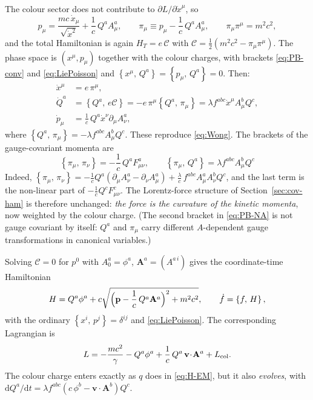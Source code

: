 \documentclass[11pt,a4paper]{book}
\numberwithin{equation}{section}
\newcommand{\dd}{\mathrm{d}}
\newcommand{\PB}[2]{\left\{#1,\,#2\right\}}
\newcommand{\Cc}{\mathcal{C}}          %
\newcommand{\bv}{\mathbf{v}}
\newcommand{\bp}{\mathbf{p}}
\newcommand{\bA}{\mathbf{A}}
\theoremstyle{definition}
\theoremstyle{remark}
\begin{document}
The colour sector does not contribute to $\partial L/\partial\dot x^\mu$, so
\begin{equation}
  p_\mu=\frac{mc\,\dot x_\mu}{\sqrt{\dot x^2}}+\frac1c\,Q^aA^a_\mu,\qquad
  \pi_\mu\equiv p_\mu-\frac1c\,Q^aA^a_\mu,\qquad
  \pi_\mu\pi^\mu=m^2c^2 ,
\end{equation}
and the total Hamiltonian is again $H_T=e\,\Cc$ with
$\Cc=\tfrac12(m^2c^2-\pi_\mu\pi^\mu)$.  The phase space is
$(x^\mu,p_\mu)$ together with the colour charges, with brackets
\eqref{eq:PB-conv} and \eqref{eq:LiePoisson} and
$\PB{x^\mu}{Q^a}=\PB{p_\mu}{Q^a}=0$.  Then:
\begin{align}
  \dot x^\mu&=e\,\pi^\mu,\\
  \dot Q^a&=\PB{Q^a}{e\Cc}=-e\,\pi^\mu\PB{Q^a}{\pi_\mu}
  =\lambda f^{abc}\dot x^\mu A^b_\mu Q^c,
  \label{eq:Qdot-ham}\\
  \dot p_\mu&=\frac1c\,Q^a\dot x^\nu\partial_\mu A^a_\nu ,
\end{align}
where $\PB{Q^a}{\pi_\mu}=-\lambda f^{abc}A^b_\mu Q^c$.  These reproduce
\eqref{eq:Wong}.  The brackets of the gauge-covariant momenta are
\begin{equation}
  \boxed{\ \PB{\pi_\mu}{\pi_\nu}=-\frac1c\,Q^aF^a_{\mu\nu},\qquad
  \PB{\pi_\mu}{Q^a}=\lambda f^{abc}A^b_\mu Q^c\ }
  \label{eq:PB-NA}
\end{equation}
Indeed, 
$\PB{\pi_\mu}{\pi_\nu}=-\tfrac1cQ^a(\partial_\mu A^a_\nu-\partial_\nu A^a_\mu)
+\tfrac\lambda c\,f^{abc}A^a_\mu A^b_\nu Q^c$, and the last term is the
non-linear part of $-\tfrac1cQ^cF^c_{\mu\nu}$.  The Lorentz-force structure
of Section~\ref{sec:cov-ham} is therefore unchanged: \emph{the force is the
curvature of the kinetic momenta}, now weighted by the colour charge.
(The second bracket in \eqref{eq:PB-NA} is not gauge covariant by itself:
$Q^a$ and $\pi_\mu$ carry different $A$-dependent gauge transformations in
canonical variables.)

Solving $\Cc=0$ for $p^0$ with $A^a_0=\phi^a$, $\bA^a=(A^{a\,i})$ gives the
coordinate-time Hamiltonian
\begin{equation}
  H=Q^a\phi^a+c\sqrt{\Bigl(\bp-\frac1c\,Q^a\bA^a\Bigr)^2+m^2c^2},\qquad
  \dot f=\PB fH,
  \label{eq:H-NA}
\end{equation}
with the ordinary $\PB{x^i}{p^j}=\delta^{ij}$ and \eqref{eq:LiePoisson}.  The
corresponding Lagrangian is
\begin{equation}
  L=-\frac{mc^2}\gamma-Q^a\phi^a+\frac1c\,Q^a\,\bv\!\cdot\!\bA^a+L_{\rm col}.
\end{equation}
The colour charge enters exactly as $q$ does in
\eqref{eq:H-EM}, but it also \emph{evolves}, with
$\dd Q^a/\dd t=\lambda f^{abc}(c\,\phi^b-\bv\!\cdot\!\bA^b)Q^c$.
\end{document}
